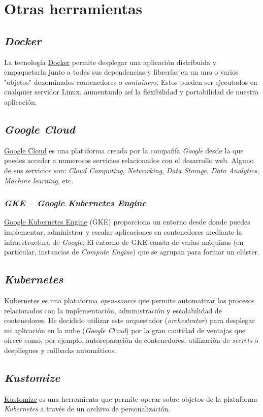 \section{Otras herramientas}

\subsection{\emph{Docker}}

La tecnología \href{https://www.docker.com/}{Docker} permite desplegar
una aplicación distribuida y empaquetarla junto a todas sus dependencias
y librerías en un uno o varios "objetos" denominados contenedores o
\emph{containers}. Estos pueden ser ejecutados en cualquier servidor
Linux, aumentando así la flexibilidad y portabilidad de nuestra
aplicación.

\subsection{\emph{Google Cloud}}

\href{https://cloud.google.com/}{Google Cloud} es una plataforma creada
por la compañía \emph{Google} desde la que puedes acceder a numerosos
servicios relacionados con el desarrollo web. Alguno de sus servicios
son: \emph{Cloud Computing}, \emph{Networking}, \emph{Data Storage},
\emph{Data Analytics}, \emph{Machine learning}, etc.

\subsubsection{\emph{GKE -- Google Kubernetes Engine}}

\href{https://cloud.google.com/kubernetes-engine}{Google Kubernetes
Engine} (GKE) proporciona un entorno desde donde puedes implementar,
administrar y escalar aplicaciones en contenedores mediante la
infraestructura de \emph{Google}. El entorno de GKE consta de varias
máquinas (en particular, instancias de \emph{Compute Engine}) que se
agrupan para formar un clúster.

\subsection{\emph{Kubernetes}}

\href{https://kubernetes.io/es/}{Kubernetes} es una plataforma
\emph{open-source} que permite automatizar los procesos relacionados con
la implementación, administración y escalabilidad de contenedores. He
decidido utilizar este orquestador (\emph{orchestrator}) para desplegar
mi aplicación en la nube (\emph{Google Cloud}) por la gran cantidad de
ventajas que ofrece como, por ejemplo, autoreparación de contenedores,
utilización de \emph{secrets} o despliegues y rollbacks automáticos.

\subsection{\emph{Kustomize}}

\href{https://github.com/kubernetes-sigs/kustomize}{Kustomize} es una
herramienta que permite operar sobre objetos de la plataforma
\emph{Kubernetes} a través de un archivo de personalización.